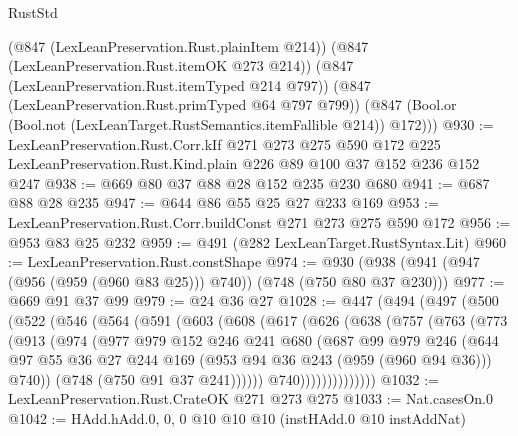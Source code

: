 \begin{lexlean}{RustStd}
\begin{coremodule}
      (@847 (LexLeanPreservation.Rust.plainItem @214))
      (@847 (LexLeanPreservation.Rust.itemOK @273 @214))
      (@847 (LexLeanPreservation.Rust.itemTyped @214 @797))
      (@847 (LexLeanPreservation.Rust.primTyped @64 @797 @799))
      (@847 (Bool.or (Bool.not (LexLeanTarget.RustSemantics.itemFallible @214)) @172)))
@930 := LexLeanPreservation.Rust.Corr.kIf
    @271
    @273
    @275
    @590
    @172
    @225
    LexLeanPreservation.Rust.Kind.plain
    @226
    @89
    @100
    @37
    @152
    @236
    @152
    @247
@938 := @669 @80 @37 @88 @28 @152 @235 @230 @680
@941 := @687 @88 @28 @235
@947 := @644 @86 @55 @25 @27 @233 @169
@953 := LexLeanPreservation.Rust.Corr.buildConst @271 @273 @275 @590 @172
@956 := @953 @83 @25 @232
@959 := @491 (@282 LexLeanTarget.RustSyntax.Lit)
@960 := LexLeanPreservation.Rust.constShape
@974 := @930 (@938 (@941 (@947 (@956 (@959 (@960 @83 @25))) @740)) (@748 (@750 @80 @37 @230)))
@977 := @669 @91 @37 @99
@979 := @24 @36 @27
@1028 := @447
    (@494
      (@497
        (@500
          (@522
            (@546
              (@564
                (@591
                  (@603
                    (@608
                      (@617
                        (@626
                          (@638
                            (@757
                              (@763
                                (@773
                                  (@913
                                    (@974
                                      (@977
                                        @979
                                        @152
                                        @246
                                        @241
                                        @680
                                        (@687
                                          @99
                                          @979
                                          @246
                                          (@644
                                            @97
                                            @55
                                            @36
                                            @27
                                            @244
                                            @169
                                            (@953 @94 @36 @243 (@959 (@960 @94 @36)))
                                            @740))
                                        (@748 (@750 @91 @37 @241))))))
                                @740))))))))))))))
@1032 := LexLeanPreservation.Rust.CrateOK @271 @273 @275
@1033 := Nat.casesOn.{0}
@1042 := HAdd.hAdd.{0, 0, 0} @10 @10 @10 (instHAdd.{0} @10 instAddNat)

\end{coremodule}
\end{lexlean}
